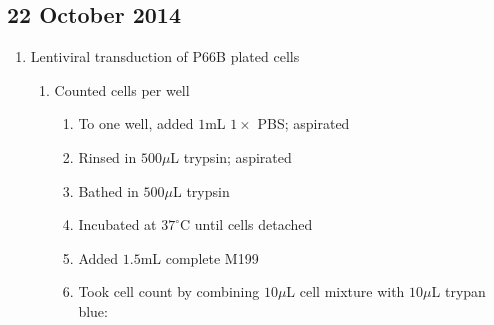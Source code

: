 \subsection*{22 October 2014}
\begin{enumerate}
	\item Lentiviral transduction of P66B plated cells
		\begin{enumerate}
			\item Counted cells per well
				\begin{enumerate}
					\item To one well, added $1$mL $1\times$ PBS; aspirated
					\item Rinsed in $500\mu$L trypsin; aspirated
					\item Bathed in $500\mu$L trypsin
					\item Incubated at $37^{\circ}$C until cells detached
					\item Added $1.5$mL complete M199
					\item Took cell count by combining $10\mu$L cell mixture with $10\mu$L trypan blue:
			

\end{enumerate}
\end{enumerate}
\end{enumerate}

